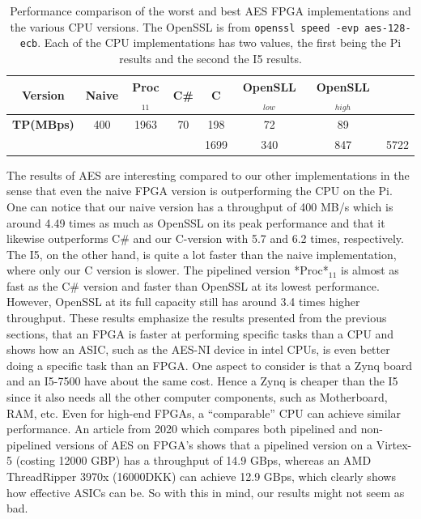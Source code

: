 \documentclass[a4paper, openany]{book}
\begin{document}
\begin{abstact}
\begin{table}[H]
\centering
\captionsetup{width=.8\linewidth}
\begin{tabular}{c c c c c c c c}
\hline
\textbf{Version} & Naive & Proc$_{11}$ & C\# & C & OpenSLL$_{low}$ & OpenSLL$_{high}$\\
\hline
\textbf{TP(MBps)} & 400 & 1963 &    70& 198 & 72  & 89\\
 &                &     &      & 1699 & 340 & 847 & 5722
\end{tabular}
\caption[AES: FPGA and CPU comparisons]%
{Performance comparison of the worst and best AES FPGA implementations and the various CPU versions. The OpenSSL is from \texttt{openssl speed -evp aes-128-ecb}. Each of the CPU implementations has two values, the first being the Pi results and the second the I5 results.}
\label{tab:AEScompare}
\end{table}
The results of AES are interesting compared to our other implementations in the sense that even the naive FPGA version is outperforming the CPU on the Pi. One can notice that our naive version has a throughput of 400 MB/s which is around 4.49 times as much as OpenSSL on its peak performance and that it likewise outperforms C\# and our C-version with 5.7 and 6.2 times, respectively. The I5, on the other hand, is quite a lot faster than the naive implementation, where only our C version is slower. The pipelined version *Proc*\(_{11}\) is almost as fast as the C\# version and faster than OpenSSL at its lowest performance. However, OpenSSL at its full capacity still has around 3.4 times higher throughput. These results emphasize the results presented from the previous sections, that an FPGA is faster at performing specific tasks than a CPU and shows how an ASIC, such as the AES-NI device in intel CPUs, is even better doing a specific task than an FPGA. One aspect to consider is that a Zynq board and an I5-7500 have about the same cost. Hence a Zynq is cheaper than the I5 since it also needs all the other computer components, such as Motherboard, RAM, etc.
Even for high-end FPGAs, a ``comparable'' CPU can achieve similar performance.
An article from 2020 which compares both pipelined and non-pipelined versions of AES on FPGA's shows that a pipelined version on a Virtex-5 (costing 12000 GBP) has a throughput of 14.9 GBps\cite{Zodpe}, whereas an AMD ThreadRipper 3970x (16000DKK) can achieve 12.9 GBps, which clearly shows how effective ASICs can be. So with this in mind, our results might not seem as bad.


\end{abstact}
\end{document}
